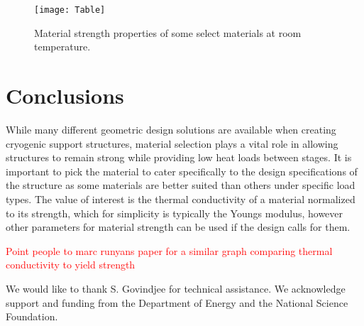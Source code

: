 \documentclass[final]{svjour2}
\begin{document}
\begin{figure}[!ht]
\begin{center}
\texttt{[image: Table]}
\end{center}
\caption{Material strength properties of some select materials at room temperature.}
\label{SW}
\end{figure}

\section{Conclusions}
While many different geometric design solutions are available when creating cryogenic support structures, material selection plays a vital role in allowing structures to remain strong while providing low heat loads between stages.  It is important to pick the material to cater specifically to the design specifications of the structure as some materials are better suited than others under specific load types.  The value of interest is the thermal conductivity of a material normalized to its strength, which for simplicity is typically the Youngs modulus, however other parameters for material strength can be used if the design calls for them.

\textcolor{red}{Point people to marc runyans paper for a similar graph comparing thermal conductivity to yield strength}

\begin{acknowledgements}
We would like to thank S. Govindjee for technical assistance. We acknowledge support and funding from the Department of Energy and the National Science Foundation.
\end{acknowledgements}
\end{document}
